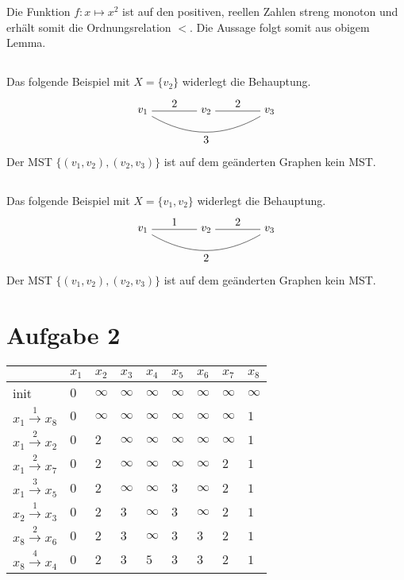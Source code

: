 \documentclass[a4paper]{article}
\begin{document}
Die Funktion $f: x \mapsto x^2$ ist auf den positiven, reellen Zahlen streng monoton und
erhält somit die Ordnungsrelation $<$. Die Aussage folgt somit aus obigem
Lemma.

\subsection{}

Das folgende Beispiel mit $X = \{v_2\}$ widerlegt die Behauptung.
\[
\begin{tikzpicture}[auto, node distance=2cm]
	\node (v1) {$v_1$};
	\node (v2) [right of=v1] {$v_2$};
	\node (v3) [right of=v2] {$v_3$};
	\path
		(v1) edge node {$2$} (v2)
		(v2) edge node {$2$} (v3)
		(v1) edge [bend right] node [anchor=base, below] {$3$} (v3)
	;
\end{tikzpicture}
\]
Der MST $\{ (v_1, v_2), (v_2, v_3)\}$ ist auf dem geänderten Graphen kein
MST.

\subsection{}
Das folgende Beispiel mit $X = \{v_1, v_2\}$ widerlegt die Behauptung.
\[
\begin{tikzpicture}[auto, node distance=2cm]
	\node (v1) {$v_1$};
	\node (v2) [right of=v1] {$v_2$};
	\node (v3) [right of=v2] {$v_3$};
	\path
		(v1) edge node {$1$} (v2)
		(v2) edge node {$2$} (v3)
		(v1) edge [bend right] node [anchor=base, below] {$2$} (v3)
	;
\end{tikzpicture}
\]
Der MST $\{ (v_1, v_2), (v_2, v_3)\}$ ist auf dem geänderten Graphen kein
MST.


\section{Aufgabe 2}

\begin{tabular}{l|l|l|l|l|l|l|l|l}
	& $x_1$ & $x_2$ & $x_3$ & $x_4$ & $x_5$ & $x_6$ & $x_7$ & $x_8$ \\
\hline
init	& $0$ & $\infty$ & $\infty$ & $\infty$ & $\infty$ & $\infty$ & $\infty$ & $\infty$ \\
\hline
$x_1 \xrightarrow{1} x_8$	& $0$ & $\infty$ & $\infty$ & $\infty$ & $\infty$ & $\infty$ & $\infty$ & $1$ \\
\hline
$x_1 \xrightarrow{2} x_2$	& $0$ & $2$ & $\infty$ & $\infty$ & $\infty$ & $\infty$ & $\infty$ & $1$ \\
\hline
$x_1 \xrightarrow{2} x_7$	& $0$ & $2$ & $\infty$ & $\infty$ & $\infty$ & $\infty$ & $2$ & $1$ \\
\hline
$x_1 \xrightarrow{3} x_5$	& $0$ & $2$ & $\infty$ & $\infty$ & $3$ & $\infty$ & $2$ & $1$ \\
\hline
$x_2 \xrightarrow{1} x_3$	& $0$ & $2$ & $3$ & $\infty$ & $3$ & $\infty$ & $2$ & $1$ \\
\hline
$x_8 \xrightarrow{2} x_6$	& $0$ & $2$ & $3$ & $\infty$ & $3$ & $3$ & $2$ & $1$ \\
\hline
$x_8 \xrightarrow{4} x_4$	& $0$ & $2$ & $3$ & $5$ & $3$ & $3$ & $2$ & $1$ \\
\hline
\end{tabular}
\end{document}
